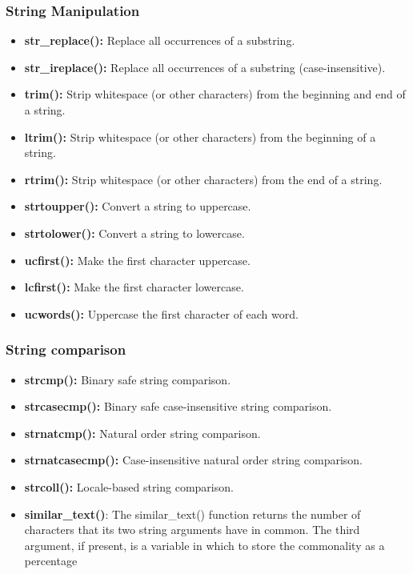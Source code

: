 \documentclass{report}
\begin{document}
\subsubsection{String Manipulation}
\bigbreak \noindent 
\begin{itemize}
    \item \textbf{str\_replace():} Replace all occurrences of a substring.
    \item \textbf{str\_ireplace():} Replace all occurrences of a substring (case-insensitive).
    \item \textbf{trim():} Strip whitespace (or other characters) from the beginning and end of a string.
    \item \textbf{ltrim():} Strip whitespace (or other characters) from the beginning of a string.
    \item \textbf{rtrim():} Strip whitespace (or other characters) from the end of a string.
    \item \textbf{strtoupper():} Convert a string to uppercase.
    \item \textbf{strtolower():} Convert a string to lowercase.
    \item \textbf{ucfirst():} Make the first character uppercase.
    \item \textbf{lcfirst():} Make the first character lowercase.
    \item \textbf{ucwords():} Uppercase the first character of each word.
\end{itemize}

\bigbreak \noindent 
\subsubsection{String comparison}
\begin{itemize}
    \item \textbf{strcmp():} Binary safe string comparison.
    \item \textbf{strcasecmp():} Binary safe case-insensitive string comparison.
    \item \textbf{strnatcmp():} Natural order string comparison.
    \item \textbf{strnatcasecmp():} Case-insensitive natural order string comparison.
    \item \textbf{strcoll():} Locale-based string comparison.
    \item \textbf{similar\_text()}: The similar\_text() function returns the number of characters that its two string arguments have in common. The third argument, if present, is a variable in which to store the commonality as a percentage
\end{itemize}
\end{document}
